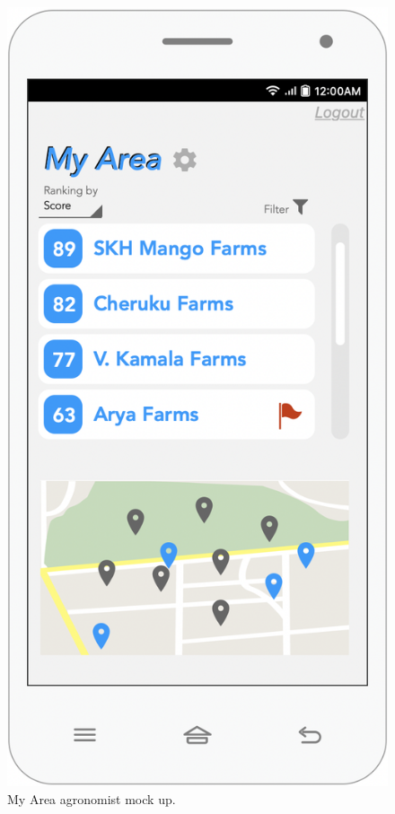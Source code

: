 \begin{multicols}{2}
 
\begin{figure}[H]
 \centering
\includegraphics[scale=0.5]{../images_diagrams/mock_ups/myarea100.png}
\caption{\label{fig:mock_area}My Area agronomist mock up.}
 \end{figure}


\end{multicols}
